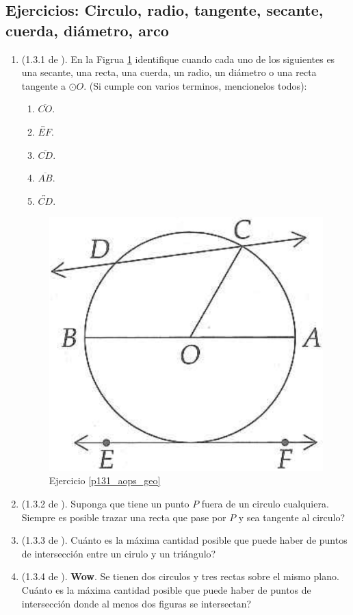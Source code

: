 \newpage
\begin{center}
	\vspace{-1cm}
	\subsection{Ejercicios: Circulo, radio, tangente, secante, cuerda, diámetro, arco}\label{ejercicios_subseccion_de_introduccion_geo_circulo}
\end{center}
	\begin{enumerate}				
			\item \label{p131_aops_geo} (1.3.1 de \cite{Aops_Geometria}). En la Figrua \ref{aops_geo_p_1_3_1} identifique cuando cada uno de los siguientes es una secante, una recta, una cuerda, un radio, un diámetro o una recta tangente a $\odot O$. (Si cumple con varios terminos, mencionelos todos):
			\begin{enumerate}[label=\Alph*)]
					\item $\overline{CO}$.
					\item $\overleftrightarrow{EF}$.
					\item $\overline{CD}$.
					\item $\overline{AB}$.
					\item $\overleftrightarrow{CD}$.
			\end{enumerate}
			
				\begin{figure}[H]
					\centering
					\includegraphics[width=0.35\linewidth]{Geometria/imgs/aops_geo_p_1_3_1}
					\caption{Ejercicio \ref{p131_aops_geo}}
					\label{aops_geo_p_1_3_1}
				\end{figure}
			\item \label{p132_aops_geo} (1.3.2 de \cite{Aops_Geometria}). Suponga que tiene un punto $P$ fuera de un circulo cualquiera. Siempre es posible trazar una recta que pase por $P$ y sea tangente al circulo?
			
			\item \label{p133_aops_geo} (1.3.3 de \cite{Aops_Geometria}). Cuánto es la máxima cantidad posible que puede haber de puntos de intersección entre un cirulo y un triángulo?
			
			\item \label{p134_aops_geo} (1.3.4 de \cite{Aops_Geometria}). \textbf{Wow}. Se tienen dos circulos y tres rectas sobre el mismo plano. Cuánto es la máxima cantidad posible que puede haber de puntos de intersección donde al menos dos figuras se intersectan?
	\end{enumerate}
\newpage

